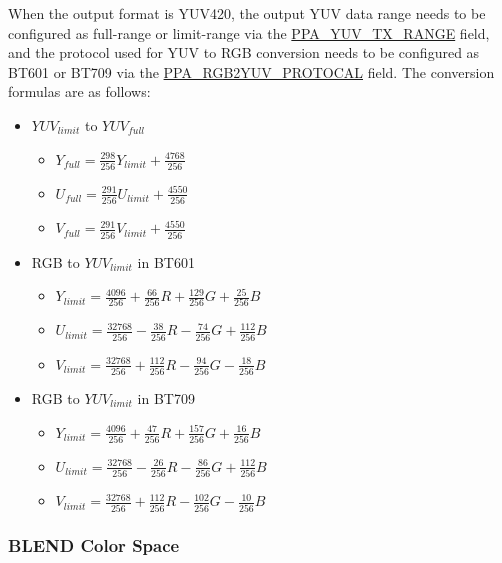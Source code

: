\documentclass[main\_\_EN.tex]{subfiles}
\begin{document}
When the output format is YUV420, the output YUV data range needs to be configured as full-range or limit-range via the \hyperref[fielddesc:PPAYUVTXRANGE]{PPA\_YUV\_TX\_RANGE} field, and the protocol used for YUV to RGB conversion needs to be configured as BT601 or BT709 via the \hyperref[fielddesc:PPARGB2YUVPROTOCAL]{PPA\_RGB2YUV\_PROTOCAL} field. The conversion formulas are as follows:

\begin{itemize}
    \item $YUV_{limit}$ to $YUV_{full}$
        \begin{itemize}
            \item $Y_{full} = \frac{298}{256} Y_{limit} + \frac{4768}{256}$
            \item $U_{full} = \frac{291}{256} U_{limit} + \frac{4550}{256}$
            \item $V_{full} = \frac{291}{256} V_{limit} + \frac{4550}{256}$
        \end{itemize}
    \item RGB to $YUV_{limit}$ in BT601
        \begin{itemize}
            \item $Y_{limit} = \frac{4096}{256} + \frac{66}{256}R + \frac{129}{256}G + \frac{25}{256}B$
            \item $U_{limit} = \frac{32768}{256} - \frac{38}{256}R - \frac{74}{256}G + \frac{112}{256}B$
            \item $V_{limit} = \frac{32768}{256} + \frac{112}{256}R - \frac{94}{256}G - \frac{18}{256}B$
        \end{itemize}
    \item RGB to $YUV_{limit}$ in BT709
        \begin{itemize}
            \item $Y_{limit} = \frac{4096}{256} + \frac{47}{256}R + \frac{157}{256}G + \frac{16}{256}B$
            \item $U_{limit} = \frac{32768}{256} - \frac{26}{256}R - \frac{86}{256}G + \frac{112}{256}B$
            \item $V_{limit} = \frac{32768}{256} + \frac{112}{256}R - \frac{102}{256}G - \frac{10}{256}B$
        \end{itemize}
\end{itemize}


\subsubsection{BLEND Color Space}
\label{sec:blend-color-space}
\end{document}
